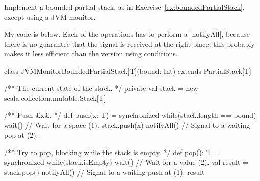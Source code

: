 \begin{questionS}
Implement a bounded partial stack, as in
Exercise~\ref{ex:boundedPartialStack}, except using a JVM monitor.
\end{questionS}


\begin{answerS}
My code is below.  Each of the operations has to perform a |notifyAll|,
because there is no guarantee that the signal is received at the right place:
this probably makes it less efficient than the version using conditions.
%
\begin{scala}
class JVMMonitorBoundedPartialStack[T](bound: Int) extends PartialStack[T]{
  /** The current state of the stack. */
  private val stack = new scala.collection.mutable.Stack[T]

  /** Push £x£. */
  def push(x: T) = synchronized{ 
    while(stack.length == bound) wait() // Wait for a space (1).
    stack.push(x)
    notifyAll() // Signal to a waiting pop at (2).
  }

  /** Try to pop, blocking while the stack is empty.  */
  def pop(): T = synchronized{ 
    while(stack.isEmpty) wait() // Wait for a value (2).
    val result = stack.pop()
    notifyAll() // Signal to a waiting push at (1).
    result
  }
}
\end{scala}
\end{answerS}
